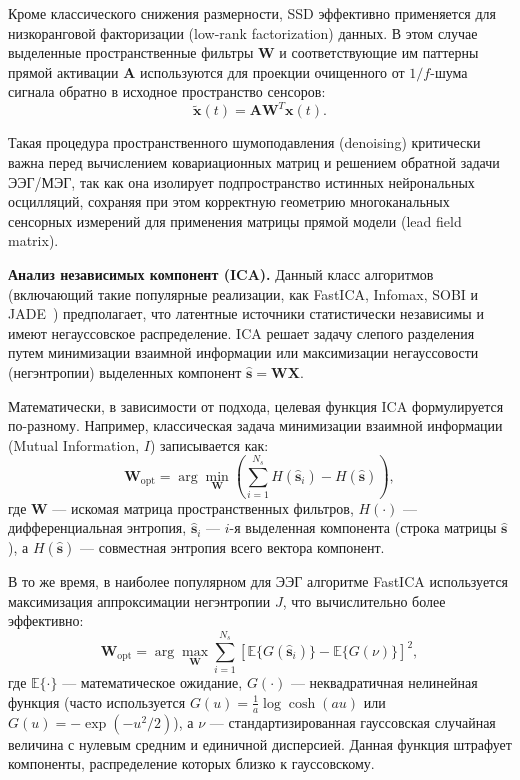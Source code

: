 Кроме классического снижения размерности, SSD эффективно применяется для низкоранговой факторизации (low-rank factorization) данных. В этом случае выделенные пространственные фильтры $\mathbf{W}$ и соответствующие им паттерны прямой активации $\mathbf{A}$ используются для проекции очищенного от $1/f$-шума сигнала обратно в исходное пространство сенсоров:
\begin{equation}
	\tilde{\mathbf{x}}(t) = \mathbf{A} \mathbf{W}^T \mathbf{x}(t).
\end{equation}

Такая процедура пространственного шумоподавления (denoising) критически важна перед вычислением ковариационных матриц и решением обратной задачи ЭЭГ/МЭГ, так как она изолирует подпространство истинных нейрональных осцилляций, сохраняя при этом корректную геометрию многоканальных сенсорных измерений для применения матрицы прямой модели (lead field matrix).

\textbf{Анализ независимых компонент (ICA).}
Данный класс алгоритмов (включающий такие популярные реализации, как FastICA, Infomax, SOBI и JADE~\cite{langlois2010introduction, sahonero2017comparison, makeig1996independent, hyvarinen2000independent}) предполагает, что латентные источники статистически независимы и имеют негауссовское распределение. ICA решает задачу слепого разделения путем минимизации взаимной информации или максимизации негауссовости (негэнтропии) выделенных компонент $\hat{\mathbf{s}} = \mathbf{W} \mathbf{X}$.

Математически, в зависимости от подхода, целевая функция ICA формулируется по-разному. Например, классическая задача минимизации взаимной информации (Mutual Information, $I$) записывается как:
\begin{equation}
	\mathbf{W}_{\text{opt}} = \arg\min_{\mathbf{W}} \left( \sum_{i=1}^{N_s} H(\hat{\mathbf{s}}_i) - H(\hat{\mathbf{s}}) \right),
\end{equation}
где $\mathbf{W}$ --- искомая матрица пространственных фильтров, $H(\cdot)$ --- дифференциальная энтропия, $\hat{\mathbf{s}}_i$ --- $i$-я выделенная компонента (строка матрицы $\hat{\mathbf{s}}$), а $H(\hat{\mathbf{s}})$ --- совместная энтропия всего вектора компонент.

В то же время, в наиболее популярном для ЭЭГ алгоритме FastICA используется максимизация аппроксимации негэнтропии $J$, что вычислительно более эффективно:
\begin{equation}
	\mathbf{W}_{\text{opt}} = \arg\max_{\mathbf{W}} \sum_{i=1}^{N_s} \left[ \mathbb{E}\{G(\hat{\mathbf{s}}_i)\} - \mathbb{E}\{G(\nu)\} \right]^2,
\end{equation}
где $\mathbb{E}\{\cdot\}$ --- математическое ожидание, $G(\cdot)$ --- неквадратичная нелинейная функция (часто используется $G(u) = \frac{1}{a} \log \cosh(au)$ или $G(u) = -\exp(-u^2/2)$), а $\nu$ --- стандартизированная гауссовская случайная величина с нулевым средним и единичной дисперсией. Данная функция штрафует компоненты, распределение которых близко к гауссовскому.


